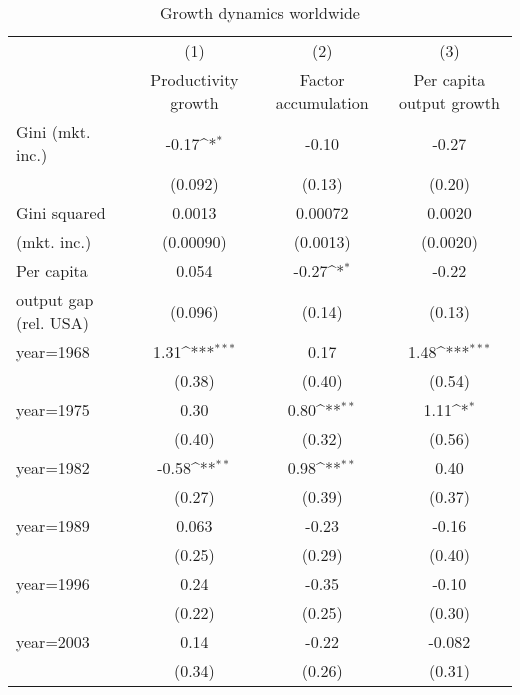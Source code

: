 \begin{sidewaystable}[htbp]\centering
\def\sym#1{\ifmmode^{#1}\else\(^{#1}\)\fi}
\caption{Growth dynamics worldwide}
\begin{tabular}{l*{3}{c}}
\hline\hline
                &\multicolumn{1}{c}{(1)}&\multicolumn{1}{c}{(2)}&\multicolumn{1}{c}{(3)}\\
                &\multicolumn{1}{c}{Productivity growth}&\multicolumn{1}{c}{Factor accumulation}&\multicolumn{1}{c}{Per capita output growth}\\
\hline
Gini (mkt. inc.)&    -0.17\sym{*}  &    -0.10         &    -0.27         \\
                &  (0.092)         &   (0.13)         &   (0.20)         \\
[1em]
Gini squared    &   0.0013         &  0.00072         &   0.0020         \\
(mkt. inc.)     &(0.00090)         & (0.0013)         & (0.0020)         \\
[1em]
Per capita      &    0.054         &    -0.27\sym{*}  &    -0.22         \\
output gap (rel. USA)&  (0.096)         &   (0.14)         &   (0.13)         \\
[1em]
year=1968       &     1.31\sym{***}&     0.17         &     1.48\sym{***}\\
                &   (0.38)         &   (0.40)         &   (0.54)         \\
[1em]
year=1975       &     0.30         &     0.80\sym{**} &     1.11\sym{*}  \\
                &   (0.40)         &   (0.32)         &   (0.56)         \\
[1em]
year=1982       &    -0.58\sym{**} &     0.98\sym{**} &     0.40         \\
                &   (0.27)         &   (0.39)         &   (0.37)         \\
[1em]
year=1989       &    0.063         &    -0.23         &    -0.16         \\
                &   (0.25)         &   (0.29)         &   (0.40)         \\
[1em]
year=1996       &     0.24         &    -0.35         &    -0.10         \\
                &   (0.22)         &   (0.25)         &   (0.30)         \\
[1em]
year=2003       &     0.14         &    -0.22         &   -0.082         \\
                &   (0.34)         &   (0.26)         &   (0.31)         \\

\end{tabular}
\end{sidewaystable}
